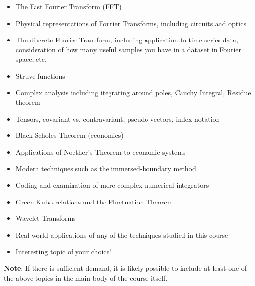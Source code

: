 \documentclass[12pt]{article}
\begin{document}
\begin{itemize}
  \item The Fast Fourier Transform (FFT)
  \item Physical representations of Fourier Transforms, including circuits and optics
  \item The discrete Fourier Transform, including application to time series data, consideration of how many useful samples you have in a dataset in Fourier space, etc.
  \item Struve functions
  \item Complex analysis including itegrating around poles, Cauchy Integral, Residue theorem
  \item Tensors, covariant vs. contravariant, pseudo-vectors, index notation
  \item Black-Scholes Theorem (economics)
  \item Applications of Noether's Theorem to economic systems
  \item Modern techniques such as the immersed-boundary method
  \item Coding and examination of more complex numerical integrators
  \item Green-Kubo relations and the Fluctuation Theorem
  \item Wavelet Transforms
  \item Real world applications of any of the techniques studied in this course
  \item Interesting topic of your choice!
\end{itemize}


\textbf{Note}: If there is sufficient demand, it is likely possible to include at least one of the above topics in the main body of the course itself.
\end{document}
